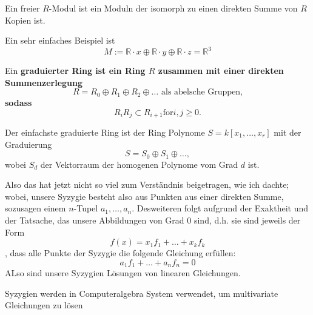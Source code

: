 \documentclass{article}
\begin{document}
	\begin{defn}
		Ein freier 
		\(R\)-Modul
		ist ein Moduln der isomorph zu einen direkten Summe von 
		\( R \)
		Kopien ist.
	\end{defn}
	\begin{bsp}
		Ein sehr einfaches Beispiel ist 
		\[
			M:= \mathbb{R} \cdot x \oplus
			\mathbb{R} \cdot y \oplus
			\mathbb{R} \cdot z =
			\mathbb{R}^3
		\]
	\end{bsp}
	\begin{defn}
		Ein \bf{graduierter Ring} ist ein Ring 
		\( R \)
		zusammen mit einer direkten Summenzerlegung
		\[
			R=R_{0} \oplus R_{1} \oplus R_{2} \oplus \dots 
			\text{ als abelsche Gruppen,}
		\]
		sodass 
		\[
			R_{i}R_{j} \subset R_{i+1} \text{for} i,j \ge 0.
		\]
	\end{defn}
	\begin{bsp}
		Der einfachste graduierte Ring ist der Ring Polynome
		\( S = k\left[ x_{1}, \dots ,x_{r} \right] \)
		mit der Graduierung 
		\[
			S=S_{0} \oplus S_{1} \oplus \dots ,
		\]
		wobei 
		\( S_{d} \) 
		der Vektorraum der homogenen Polynome vom Grad
		\( d \) 
		ist.
	\end{bsp}
	
	Also das hat jetzt nicht so viel zum Verst\"andnis beigetragen, 
	wie ich dachte;  
	wobei,
	unsere Syzygie besteht also aus Punkten 
	aus einer direkten Summe, 
	sozusagen einem 
	\(n\)-Tupel 
	\(a_{1},\dots,a_{n}\).
	Desweiteren folgt aufgrund der Exaktheit und der Tatsache, 
	das unsere Abbildungen von Grad 0 sind,
	d.h. sie sind jeweils der Form
	\[
		f\left( x \right)=x_{1}f_{1} + \dots + x_{k}f_{k}
	\],
	dass alle Punkte der Syzygie die folgende Gleichung erf\"ullen:
	\[
		a_{1} f_{1} + \dots + a_{n} f_{n} = 0	
	\]
	ALso sind unsere Syzygien L\"osungen von linearen Gleichungen.
	
	Syzygien werden in Computeralgebra System verwendet,
	um multivariate Gleichungen zu l\"osen\nocite{WA_1}

	
\end{document}
